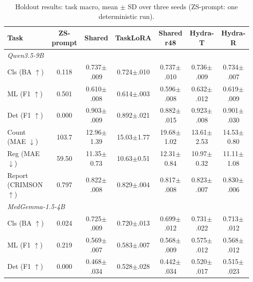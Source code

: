 \documentclass[journal,twoside,web]{ieeecolor}
\begin{document}
\begin{table}[!t]
\caption{Holdout results: task macro, mean $\pm$ SD over three seeds (ZS-prompt: one deterministic run).}
\label{tab:qwen}\label{tab:medgemma}
\centering
\setlength{\tabcolsep}{7pt}
\renewcommand{\arraystretch}{1.15}
\begin{tabular}{lcccccc}
\toprule
Task & ZS-prompt & Shared & TaskLoRA & Shared r48 & Hydra-T & Hydra-R \\
\midrule
\multicolumn{7}{l}{\textit{Qwen3.5-9B}} \\
Cls (BA $\uparrow$) & 0.118 & 0.737{\scriptsize$\pm$.009} & 0.724{\scriptsize$\pm$.010} & 0.737{\scriptsize$\pm$.010} & 0.736{\scriptsize$\pm$.009} & 0.734{\scriptsize$\pm$.007} \\
ML (F1 $\uparrow$) & 0.501 & 0.610{\scriptsize$\pm$.008} & 0.614{\scriptsize$\pm$.003} & 0.596{\scriptsize$\pm$.008} & 0.632{\scriptsize$\pm$.012} & 0.619{\scriptsize$\pm$.009} \\
Det (F1 $\uparrow$) & 0.000 & 0.903{\scriptsize$\pm$.009} & 0.892{\scriptsize$\pm$.021} & 0.882{\scriptsize$\pm$.015} & 0.923{\scriptsize$\pm$.008} & 0.901{\scriptsize$\pm$.030} \\
Count (MAE $\downarrow$) & 103.7 & 12.96{\scriptsize$\pm$1.39} & 15.03{\scriptsize$\pm$1.77} & 19.68{\scriptsize$\pm$1.02} & 13.61{\scriptsize$\pm$2.53} & 14.53{\scriptsize$\pm$0.80} \\
Reg (MAE $\downarrow$) & 59.50 & 11.35{\scriptsize$\pm$0.73} & 10.63{\scriptsize$\pm$0.51} & 12.31{\scriptsize$\pm$0.84} & 10.97{\scriptsize$\pm$0.32} & 11.11{\scriptsize$\pm$1.08} \\
Report (CRIMSON $\uparrow$) & 0.797 & 0.822{\scriptsize$\pm$.008} & 0.829{\scriptsize$\pm$.004} & 0.817{\scriptsize$\pm$.008} & 0.823{\scriptsize$\pm$.007} & 0.830{\scriptsize$\pm$.006} \\
\midrule
\multicolumn{7}{l}{\textit{MedGemma-1.5-4B}} \\
Cls (BA $\uparrow$) & 0.024 & 0.725{\scriptsize$\pm$.009} & 0.720{\scriptsize$\pm$.013} & 0.699{\scriptsize$\pm$.012} & 0.731{\scriptsize$\pm$.022} & 0.713{\scriptsize$\pm$.012} \\
ML (F1 $\uparrow$) & 0.219 & 0.569{\scriptsize$\pm$.007} & 0.583{\scriptsize$\pm$.007} & 0.568{\scriptsize$\pm$.009} & 0.575{\scriptsize$\pm$.012} & 0.568{\scriptsize$\pm$.012} \\
Det (F1 $\uparrow$) & 0.000 & 0.468{\scriptsize$\pm$.034} & 0.528{\scriptsize$\pm$.028} & 0.442{\scriptsize$\pm$.034} & 0.520{\scriptsize$\pm$.017} & 0.515{\scriptsize$\pm$.023} \\

\end{tabular}
\end{table}
\end{document}
